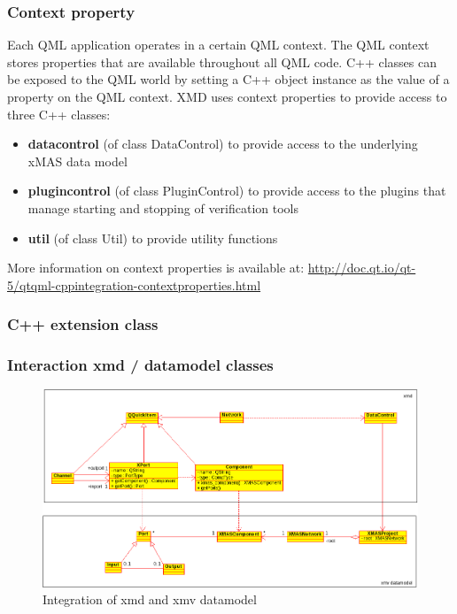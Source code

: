 \subsubsection{Context property}
Each QML application operates in a certain QML context. The QML context stores
properties that are available throughout all QML code. C++ classes can be exposed
to the QML world by setting a C++ object instance as the value of a property
on the QML context.
XMD uses context properties to provide access to three C++ classes:

\begin{itemize}
 \item \textbf{datacontrol} (of class DataControl) to provide access to the
 underlying xMAS data model
 \item \textbf{plugincontrol} (of class PluginControl) to provide access to
 the plugins that manage starting and stopping of verification tools
 \item \textbf{util} (of class Util) to provide utility functions
\end{itemize}



More information on context properties is available at:
\url{http://doc.qt.io/qt-5/qtqml-cppintegration-contextproperties.html}


\subsubsection{C++ extension class}



\subsubsection{Interaction xmd / datamodel classes}

\begin{figure}
    \includegraphics[width=\textwidth]{xmd-xmv-integration}
    \caption{Integration of xmd and xmv datamodel}
\end{figure}

